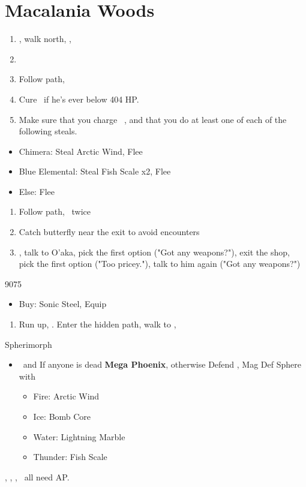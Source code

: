 \chapter{Macalania Woods}

\begin{enumerate}
	\item \sd, walk north, \sd, \save
	\item \formation{\tidus}{\rikku}{\auron}
	\item Follow path, 
	\item Cure \tidus\ if he's ever below 404 HP.
	\item Make sure that you charge \rikku\ \od, and that you do at least one of each of the following steals.
\end{enumerate}
\begin{encounters}
	\begin{itemize}
		\item Chimera: Steal Arctic Wind, Flee
		\item Blue Elemental: Steal Fish Scale x2, Flee
		\item Else: Flee
	\end{itemize}
\end{encounters}
\begin{enumerate}[resume]
	\item Follow path, \sd\ twice
	\item Catch butterfly near the exit to avoid encounters
	\formation{\tidus}{\yuna}{\kimahri}
	\item \save, talk to O'aka, pick the first option ("Got any weapons?"), exit the shop, pick the first option ("Too pricey."), talk to him again ("Got any weapons?")
\end{enumerate}
\begin{shop}{9075}
	\begin{itemize}
		\item Buy: Sonic Steel, Equip
	\end{itemize}
\end{shop}
\begin{enumerate}[resume]
	\item Run up, \sd. Enter the hidden path, walk to \auron, \sd
\end{enumerate}
\bothvfill\winvfill\lossvfill
\begin{battle}[12000]{Spherimorph}
	\begin{itemize}
		\tidusf Change Armor to Yellow Shield
		\tidusf Defend
		\yunaf Defend
		\switch{\tidus}{\rikku}
		\rikkuf Grenade, check the Element
		\item \kimahri\ and \yuna\: If anyone is dead \textbf{Mega Phoenix}, otherwise Defend
		\rikkuf \od, Mag Def Sphere with
		\begin{itemize}
			\item Fire: Arctic Wind
			\item Ice: Bomb Core
			\item Water: Lightning Marble
			\item Thunder: Fish Scale
		\end{itemize}
	\end{itemize}
	\tidus, \yuna, \kimahri, \rikku\ all need AP.
\end{battle}
